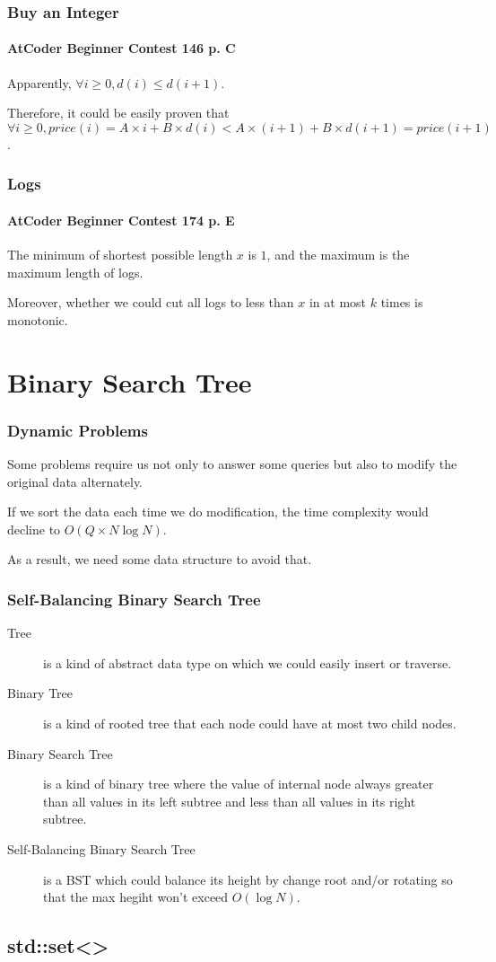 \documentclass{beamer}
\begin{document}
\frame
{
	\frametitle{Buy an Integer}
	\framesubtitle{AtCoder Beginner Contest 146 p. C}
	
	Apparently, $\forall i\geq 0, d(i)\leq d(i+1)$.\pause
	
	Therefore, it could be easily proven that $\forall i\geq 0, price(i) = A\times i+B\times d(i) < A\times(i+1)+B\times d(i+1) = price(i+1)$.\pause
}

\frame
{
	\frametitle{Logs}
	\framesubtitle{AtCoder Beginner Contest 174 p. E}
	
	The minimum of shortest possible length $x$ is $1$, and the maximum is the maximum length of logs.\pause
	
	Moreover, whether we could cut all logs to less than $x$ in at most $k$ times is monotonic.
}

\section{Binary Search Tree}

\frame
{
	\frametitle{Dynamic Problems}
	
	Some problems require us not only to answer some queries but also to modify the original data alternately.
	
	If we sort the data each time we do modification, the time complexity would decline to $O(Q\times N\log N)$.
	
	As a result, we need some data structure to avoid that.
}

\frame
{
	\frametitle{Self-Balancing Binary Search Tree}
	
	\begin{description}
		\item[Tree] is a kind of abstract data type on which we could easily insert or traverse.\pause
		\item[Binary Tree] is a kind of rooted tree that each node could have at most two child nodes.\pause
		\item[Binary Search Tree] is a kind of binary tree where the value of internal node always greater than all values in its left subtree and less than all values in its right subtree.\pause
		\item[Self-Balancing Binary Search Tree] is a BST which could balance its height by change root and/or rotating so that the max hegiht won't exceed $O(\log N)$.
	\end{description}
}

\subsection{std::set<>}
\end{document}
